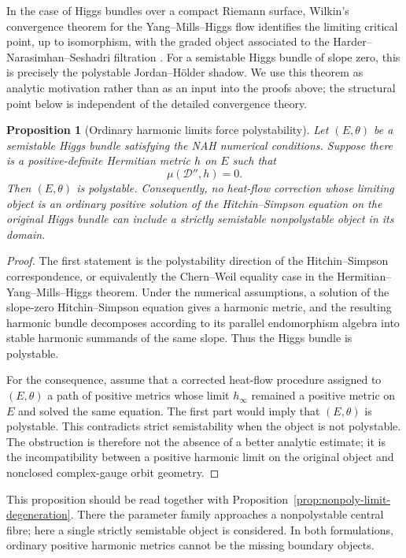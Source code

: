 \documentclass[11pt,reqno]{amsart}
\newtheorem{proposition}[theorem]{Proposition}
\theoremstyle{definition}
\theoremstyle{remark}
\newcommand{\cD}{\mathcal D}
\begin{document}
In the case of Higgs bundles over a compact Riemann surface, Wilkin's convergence theorem for the Yang--Mills--Higgs flow identifies the limiting critical point, up to isomorphism, with the graded object associated to the Harder--Narasimhan--Seshadri filtration \cite{Wilkin2008}.  For a semistable Higgs bundle of slope zero, this is precisely the polystable Jordan--H\"older shadow.  We use this theorem as analytic motivation rather than as an input into the proofs above; the structural point below is independent of the detailed convergence theory.

\begin{proposition}[Ordinary harmonic limits force polystability]\label{prop:ordinary-heat-polystable}
Let $(E,\theta)$ be a semistable Higgs bundle satisfying the NAH numerical conditions.  Suppose there is a positive-definite Hermitian metric $h$ on $E$ such that
\[
  \mu(\cD'',h)=0.
\]
Then $(E,\theta)$ is polystable.  Consequently, no heat-flow correction whose limiting object is an ordinary positive solution of the Hitchin--Simpson equation on the original Higgs bundle can include a strictly semistable nonpolystable object in its domain.
\end{proposition}

\begin{proof}
The first statement is the polystability direction of the Hitchin--Simpson correspondence, or equivalently the Chern--Weil equality case in the Hermitian--Yang--Mills--Higgs theorem.  Under the numerical assumptions, a solution of the slope-zero Hitchin--Simpson equation gives a harmonic metric, and the resulting harmonic bundle decomposes according to its parallel endomorphism algebra into stable harmonic summands of the same slope.  Thus the Higgs bundle is polystable.

For the consequence, assume that a corrected heat-flow procedure assigned to $(E,\theta)$ a path of positive metrics whose limit $h_\infty$ remained a positive metric on $E$ and solved the same equation.  The first part would imply that $(E,\theta)$ is polystable.  This contradicts strict semistability when the object is not polystable.  The obstruction is therefore not the absence of a better analytic estimate; it is the incompatibility between a positive harmonic limit on the original object and nonclosed complex-gauge orbit geometry.
\end{proof}

This proposition should be read together with Proposition~\ref{prop:nonpoly-limit-degeneration}.  There the parameter family approaches a nonpolystable central fibre; here a single strictly semistable object is considered.  In both formulations, ordinary positive harmonic metrics cannot be the missing boundary objects.
\end{document}
